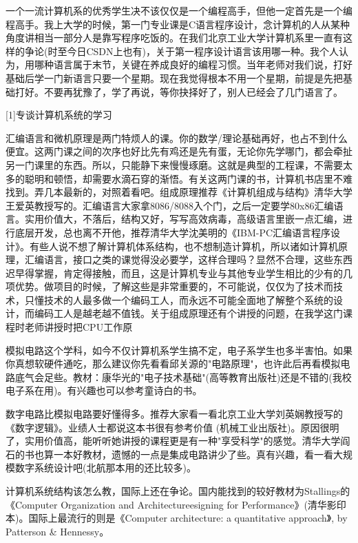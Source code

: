 一个一流计算机系的优秀学生决不该仅仅是一个编程高手，但他一定首先是一个编程高手。我上大学的时候，第一门专业课是C语言程序设计，念计算机的人从某种角度讲相当一部分人是靠写程序吃饭的。在我们北京工业大学计算机系里一直有这样的争论(时至今日CSDN上也有)，关于第一程序设计语言该用哪一种。我个人认为，用哪种语言属于末节，关键在养成良好的编程习惯。当年老师对我们说，打好基础后学一门新语言只要一个星期。现在我觉得根本不用一个星期，前提是先把基础打好。不要再犹豫了，学了再说，等你抉择好了，别人已经会了几门语言了。 

[1]专谈计算机系统的学习 

汇编语言和微机原理是两门特烦人的课。你的数学/理论基础再好，也占不到什么便宜。这两门课之间的次序也好比先有鸡还是先有蛋，无论你先学哪门，都会牵扯另一门课里的东西。所以，只能静下来慢慢琢磨。这就是典型的工程课，不需要太多的聪明和顿悟，却需要水滴石穿的渐悟。有关这两门课的书，计算机书店里不难找到。弄几本最新的，对照着看吧。组成原理推荐《计算机组成与结构》清华大学王爱英教授写的。汇编语言大家拿8086/8088入个门，之后一定要学80x86汇编语言。实用价值大，不落后，结构又好，写写高效病毒，高级语言里嵌一点汇编，进行底层开发，总也离不开他，推荐清华大学沈美明的《IBM-PC汇编语言程序设计》。有些人说不想了解计算机体系结构，也不想制造计算机，所以诸如计算机原理，汇编语言，接口之类的课觉得没必要学，这样合理吗？显然不合理，这些东西迟早得掌握，肯定得接触，而且，这是计算机专业与其他专业学生相比的少有的几项优势。做项目的时候，了解这些是非常重要的，不可能说，仅仅为了技术而技术，只懂技术的人最多做一个编码工人，而永远不可能全面地了解整个系统的设计，而编码工人是越老越不值钱。关于组成原理还有个讲授的问题，在我学这门课程时老师讲授时把CPU工作原 

模拟电路这个学科，如今不仅计算机系学生搞不定，电子系学生也多半害怕。如果你真想软硬件通吃，那么建议你先看看邱关源的"电路原理"，也许此后再看模拟电路底气会足些。教材：康华光的"电子技术基础"(高等教育出版社)还是不错的(我校电子系在用)。有兴趣也可以参考童诗白的书。 

数字电路比模拟电路要好懂得多。推荐大家看一看北京工业大学刘英娴教授写的《数字逻辑》。业绩人士都说这本书很有参考价值 (机械工业出版社)。原因很明了，实用价值高，能听听她讲授的课程更是有一种"享受科学"的感觉。清华大学阎石的书也算一本好教材，遗憾的一点是集成电路讲少了些。真有兴趣，看一看大规模数字系统设计吧(北航那本用的还比较多)。 

计算机系统结构该怎么教，国际上还在争论。国内能找到的较好教材为Stallings的《Computer Organization and Architectureesigning for Performance》(清华影印本)。国际上最流行的则是《Computer architecture: a quantitative approach》, by Patterson \& Hennessy。 


